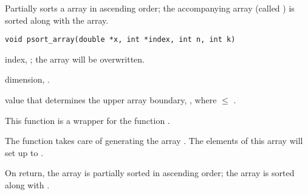 \documentclass[a4paper,oneside,10pt,DIV=12]{scrreprt}
\begin{document}
\begin{Description}
Partially sorts a  array in ascending order; the accompanying
 array (called ) is sorted along with the array.
\end{Description}
\begin{Usage}
\begin{verbatim}
void psort_array(double *x, int *index, int n, int k)
\end{verbatim}
\end{Usage}
\begin{Arguments}
	\begin{ldescription}
		\item[\code{index}] index, ; the array will be 
			overwritten. 
		\item[\code{n}] dimension, .
		\item[\code{k}]  value that determines the upper array 
			boundary, , where  $\leq$ .
	\end{ldescription}
\end{Arguments}
\begin{Details}
This function is a wrapper for the function 
.

The function takes care of generating the array . The elements of
this array will set up to . 
\end{Details}
\begin{Value}
On return, the array  is partially sorted in ascending order;
the array  is sorted along with .
\end{Value}
\end{document}
